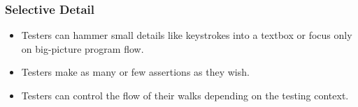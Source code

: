 \begin{frame}
  \frametitle{Selective Detail}
  \begin{itemize}
    \item Testers can hammer small details like keystrokes into a textbox or focus only on big-picture program flow.
    \item Testers make as many or few assertions as they wish.
    \item Testers can control the flow of their walks depending on the testing context.
  \end{itemize}
\end{frame}
